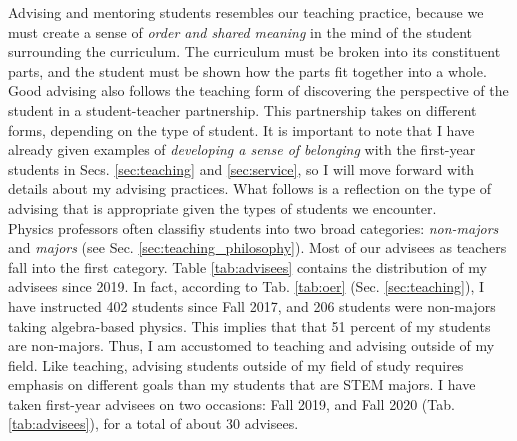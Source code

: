 \documentclass[../../../main.tex]{subfiles}
\begin{document}
Advising and mentoring students resembles our teaching practice, because we must create a sense of \textit{order and shared meaning} in the mind of the student surrounding the curriculum.  The curriculum must be broken into its constituent parts, and the student must be shown how the parts fit together into a whole.  Good advising also follows the teaching form of discovering the perspective of the student in a student-teacher partnership.  This partnership takes on different forms, depending on the type of student.  It is important to note that I have already given examples of \textit{developing a sense of belonging} with the first-year students in Secs. \ref{sec:teaching} and \ref{sec:service}, so I will move forward with details about my advising practices.  What follows is a reflection on the type of advising that is appropriate given the types of students we encounter.
\\
\vspace{0.25cm}
Physics professors often classifiy students into two broad categories: \textit{non-majors} and \textit{majors} (see Sec. \ref{sec:teaching_philosophy}).  Most of our advisees as teachers fall into the first category.  Table \ref{tab:advisees} contains the distribution of my advisees since 2019.  In fact, according to Tab. \ref{tab:oer} (Sec. \ref{sec:teaching}), I have instructed 402 students since Fall 2017, and 206 students were non-majors taking algebra-based physics.  This implies that that 51 percent of my students are non-majors.  Thus, I am accustomed to teaching and advising outside of my field.  Like teaching, advising students outside of my field of study requires emphasis on different goals than my students that are STEM majors.  I have taken first-year advisees on two occasions: Fall 2019, and Fall 2020 (Tab. \ref{tab:advisees}), for a total of about 30 advisees.
\\
\vspace{0.25cm}
\end{document}
